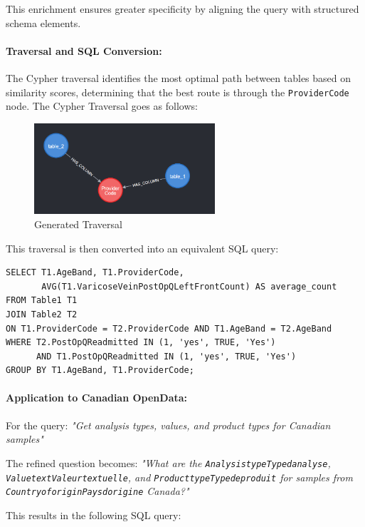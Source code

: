 This enrichment ensures greater specificity by aligning the query with structured schema elements.

\paragraph{Traversal and SQL Conversion:}
The Cypher traversal identifies the most optimal path between tables based on similarity scores, determining that the best route is through the \texttt{ProviderCode} node. 
The Cypher Traversal goes as follows:

\begin{figure}[h]
    \centering
\includegraphics[width=0.6\textwidth]{IMAGES/immagine_2025-03-28_082503566.png}
    \caption{Generated Traversal}
    \label{fig:Traversal}
\end{figure}

This traversal is then converted into an equivalent SQL query:

\begin{verbatim}
SELECT T1.AgeBand, T1.ProviderCode, 
       AVG(T1.VaricoseVeinPostOpQLeftFrontCount) AS average_count
FROM Table1 T1
JOIN Table2 T2
ON T1.ProviderCode = T2.ProviderCode AND T1.AgeBand = T2.AgeBand
WHERE T2.PostOpQReadmitted IN (1, 'yes', TRUE, 'Yes') 
      AND T1.PostOpQReadmitted IN (1, 'yes', TRUE, 'Yes')
GROUP BY T1.AgeBand, T1.ProviderCode;
\end{verbatim}

\paragraph{Application to Canadian OpenData:}
For the query:  
\textit{"Get analysis types, values, and product types for Canadian samples"}  

The refined question becomes:  
\textit{"What are the \texttt{AnalysistypeTypedanalyse}, \texttt{ValuetextValeurtextuelle}, and \texttt{ProducttypeTypedeproduit} for samples from \texttt{CountryoforiginPaysdorigine} Canada?"}  

This results in the following SQL query:

